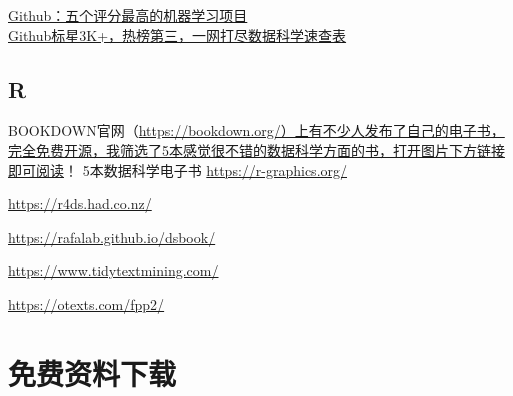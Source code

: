 \documentclass[
]{book}
\begin{document}
\href{https://mp.weixin.qq.com/s?__biz=MzA4MjYwMTc5Nw==\&mid=2648931441\&idx=1\&sn=30565c7b69731e0c7eecf2fdccb43516\&chksm=8794ee5bb0e3674db3486461c9db92f60c0d84c38d0dcbe4068bdf08c3f7ef9983b7e132fdda\&token=2004915986\&lang=en_US\#rd}{Github：五个评分最高的机器学习项目}\\
\href{https://mp.weixin.qq.com/s?__biz=MzA4MjYwMTc5Nw==\&mid=2648930261\&idx=1\&sn=fdfffd93bbf84530de500bd9be24067c\&chksm=8794e5ffb0e36ce9da004a5a2a954e3e495471ef7f7548fcd6718ea8a9e34aca1e507816fdd3\&token=2004915986\&lang=en_US\#rd}{Github标星3K+，热榜第三，一网打尽数据科学速查表}

\hypertarget{r}{%
\section{R}\label{r}}

BOOKDOWN官网（\url{https://bookdown.org/）上有不少人发布了自己的电子书，完全免费开源，我筛选了5本感觉很不错的数据科学方面的书，打开图片下方链接即可阅读}！
5本数据科学电子书
\url{https://r-graphics.org/}

\url{https://r4ds.had.co.nz/}

\url{https://rafalab.github.io/dsbook/}

\url{https://www.tidytextmining.com/}

\url{https://otexts.com/fpp2/}

\hypertarget{ux514dux8d39ux8d44ux6599ux4e0bux8f7d}{%
\chapter{免费资料下载}\label{ux514dux8d39ux8d44ux6599ux4e0bux8f7d}}
\end{document}
